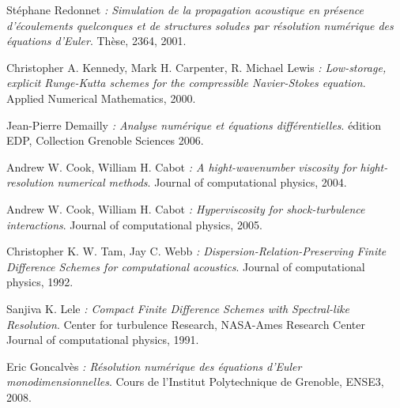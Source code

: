 \documentclass[10pt,a4paper]{amsart}
\begin{document}
\begin{thebibliography}{9}
        

         Stéphane Redonnet
         \emph{:  Simulation de la propagation acoustique en présence d'écoulements quelconques et de structures soludes par résolution numérique des équations d'Euler}.
         Thèse,
         2364,
         2001.
         
         Christopher A. Kennedy, Mark H. Carpenter, R. Michael Lewis
         \emph{:  Low-storage, explicit Runge-Kutta schemes for the compressible Navier-Stokes equation}.
         Applied Numerical Mathematics,
         2000.
         
         Jean-Pierre Demailly
         \emph{:  Analyse numérique et équations différentielles}.
         édition EDP,
         Collection Grenoble Sciences
         2006.
         
         Andrew W. Cook, William H. Cabot
         \emph{:  A hight-wavenumber viscosity for hight-resolution numerical methods}.
         Journal of computational physics,
         2004.
         
         Andrew W. Cook, William H. Cabot
         \emph{:  Hyperviscosity for shock-turbulence interactions}.
         Journal of computational physics,
         2005.
         
         Christopher K. W. Tam, Jay C. Webb
         \emph{:  Dispersion-Relation-Preserving Finite Difference Schemes for computational acoustics}.
         Journal of computational physics,
         1992.
         
         Sanjiva K. Lele
         \emph{:  Compact Finite Difference Schemes with Spectral-like Resolution}.
         Center for turbulence Research, NASA-Ames Research Center
         Journal of computational physics,
         1991.
         
         Eric Goncalvès
         \emph{:  Résolution numérique des équations d'Euler monodimensionnelles}.
         Cours de l'Institut Polytechnique de Grenoble,
         ENSE3,
         2008.

		
\end{thebibliography}
\end{document}
